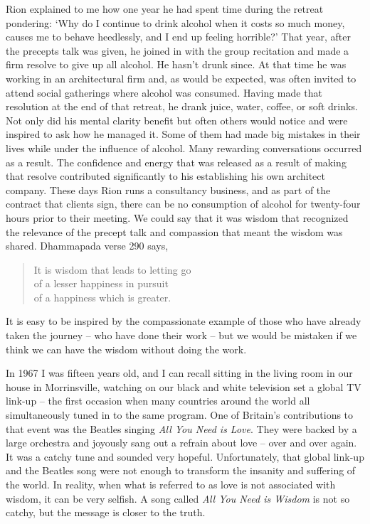 Rion explained to me how one year he had spent time during the retreat
pondering: `Why do I continue to drink alcohol when it costs so much
money, causes me to behave heedlessly, and I end up feeling horrible?'
That year, after the precepts talk was given, he joined in with the
group recitation and made a firm resolve to give up all alcohol. He
hasn't drunk since. At that time he was working in an architectural firm
and, as would be expected, was often invited to attend social gatherings
where alcohol was consumed. Having made that resolution at the end of
that retreat, he drank juice, water, coffee, or soft drinks. Not
only did his mental clarity benefit but often others would notice and
were inspired to ask how he managed it. Some of them had made big
mistakes in their lives while under the influence of alcohol. Many
rewarding conversations occurred as a result. The confidence and energy
that was released as a result of making that resolve contributed
significantly to his establishing his own architect company. These days
Rion runs a consultancy business, and as part of the contract that
clients sign, there can be no consumption of alcohol for twenty-four
hours prior to their meeting. We could say that it was wisdom that recognized the relevance of the precept talk and compassion that meant the wisdom was shared. Dhammapada verse 290 says,

\begin{quote}
  It is wisdom that leads to letting go\\
  of a lesser happiness in pursuit\\
  of a happiness which is greater.
\end{quote}

It is easy to be inspired by the compassionate example of those who have already taken the journey -- who have done their work -- but we would be mistaken if we think we can have the wisdom without doing the work.

In 1967 I was fifteen years old, and I can recall sitting in the living
room in our house in Morrinsville, watching on our black and white
television set a global TV link-up\cite{satellite} -- the
first occasion when many countries around the world all simultaneously
tuned in to the same program. One of Britain's contributions to that
event was the Beatles singing \emph{All You Need is Love}. They were backed
by a large orchestra and joyously sang out a refrain about love -- over
and over again. It was a catchy tune and sounded very hopeful.
Unfortunately, that global link-up and the Beatles song were not enough
to transform the insanity and suffering of the world. In reality, when
what is referred to as love is not associated with wisdom, it can be
very selfish. A song called \emph{All You Need is Wisdom} is not so catchy,
but the message is closer to the truth.

